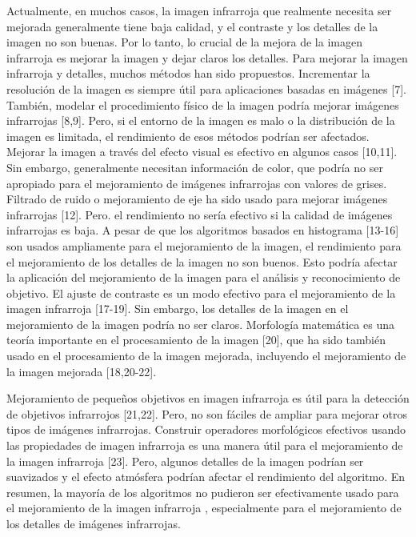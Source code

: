 \documentclass[a4paper, 11 pt, conference]{ieeeconf}      %
\begin{document}
Actualmente, en muchos casos, la imagen infrarroja que realmente necesita ser mejorada generalmente tiene baja calidad, y el contraste y los detalles de la imagen no son buenas. Por lo tanto, lo crucial de la mejora de la imagen infrarroja es mejorar la imagen y dejar claros los detalles. Para mejorar la imagen infrarroja y detalles, muchos m\'etodos han sido propuestos. Incrementar la resoluci\'on de la imagen es siempre \'util para aplicaciones basadas en im\'agenes [7]. Tambi\'en, modelar el procedimiento f\'isico de la imagen podr\'ia mejorar im\'agenes infrarrojas [8,9]. Pero, si el entorno de la imagen es malo o la distribuci\'on de la imagen es limitada, el rendimiento de esos m\'etodos podr\'ian ser afectados. Mejorar la imagen a trav\'es del efecto visual es efectivo en algunos casos [10,11]. Sin embargo, generalmente necesitan informaci\'on de color, que podr\'ia no ser apropiado para el mejoramiento de im\'agenes infrarrojas con valores de grises. Filtrado de ruido o mejoramiento de eje ha sido usado para mejorar im\'agenes infrarrojas [12]. Pero. el rendimiento no ser\'ia efectivo si la calidad de im\'agenes infrarrojas es baja. A pesar de que los algoritmos basados  en histograma [13-16] son usados ampliamente para el mejoramiento de la imagen, el rendimiento para el mejoramiento de los detalles de la imagen no son buenos. Esto podr\'ia afectar la aplicaci\'on del mejoramiento de la imagen para el an\'alisis y reconocimiento de objetivo. El ajuste de contraste es un modo efectivo para el mejoramiento de la imagen infrarroja [17-19]. Sin embargo, los detalles de la imagen en el mejoramiento de la imagen podr\'ia no ser claros. Morfolog\'ia matem\'atica es una teor\'ia importante en el procesamiento de la imagen [20], que ha sido tambi\'en usado en el procesamiento de la imagen mejorada, incluyendo el mejoramiento de la imagen mejorada [18,20-22].

Mejoramiento de pequeños objetivos en imagen infrarroja es \'util para la detecci\'on de objetivos infrarrojos [21,22]. Pero, no son f\'aciles de ampliar para mejorar otros tipos de im\'agenes infrarrojas. Construir operadores morfol\'ogicos efectivos usando las propiedades de imagen infrarroja es una manera \'util para el mejoramiento de la imagen infrarroja [23]. Pero, algunos detalles de la imagen podr\'ian ser suavizados y el efecto atm\'osfera podr\'ian afectar el rendimiento del algoritmo. En resumen, la mayor\'ia de los algoritmos no pudieron ser efectivamente usado para el mejoramiento de la imagen infrarroja , especialmente para el mejoramiento de los detalles de im\'agenes infrarrojas.
\end{document}

